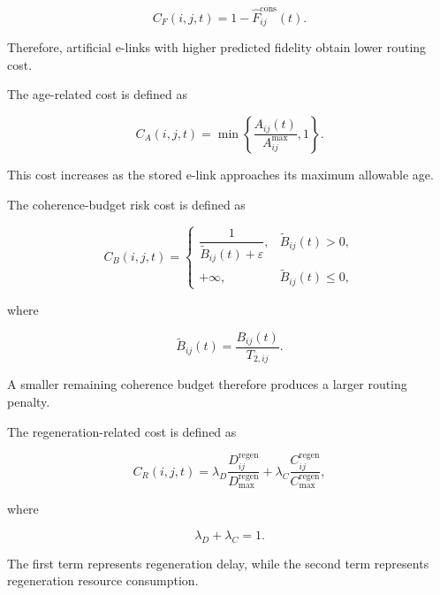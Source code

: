 \begin{equation}
    C_F(i,j,t)
    =
    1-
    \widehat{F}_{ij}^{\mathrm{cons}}(t).
\end{equation}

Therefore, artificial e-links with higher predicted fidelity obtain lower routing cost.

The age-related cost is defined as

\begin{equation}
    C_A(i,j,t)
    =
    \min
    \left\{
    \frac{
    A_{ij}(t)
    }{
    A_{ij}^{\max}
    },
    1
    \right\}.
\end{equation}

This cost increases as the stored e-link approaches its maximum allowable age.

The coherence-budget risk cost is defined as

\begin{equation}
    C_B(i,j,t)
    =
    \begin{cases}
    \dfrac{
    1
    }{
    \widetilde{B}_{ij}(t)+\varepsilon
    },
    &
    \widetilde{B}_{ij}(t)>0,
    \\[10pt]
    +\infty,
    &
    \widetilde{B}_{ij}(t)\leq0 ,
    \end{cases}
\end{equation}

where

\begin{equation}
    \widetilde{B}_{ij}(t)
    =
    \frac{
    B_{ij}(t)
    }{
    T_{2,ij}
    }.
\end{equation}

A smaller remaining coherence budget therefore produces a larger routing penalty.

The regeneration-related cost is defined as

\begin{equation}
    C_R(i,j,t)
    =
    \lambda_D
    \frac{
    D_{ij}^{\mathrm{regen}}
    }{
    D_{\max}^{\mathrm{regen}}
    }
    +
    \lambda_C
    \frac{
    C_{ij}^{\mathrm{regen}}
    }{
    C_{\max}^{\mathrm{regen}}
    },
\end{equation}

where

\begin{equation}
    \lambda_D+\lambda_C=1 .
\end{equation}

The first term represents regeneration delay, while the second term represents regeneration resource consumption.


